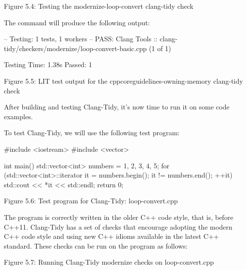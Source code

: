 \begin{center}
Figure 5.4: Testing the modernize-loop-convert clang-tidy check
\end{center}

The command will produce the following output:

\begin{shell}
-- Testing: 1 tests, 1 workers --
PASS: Clang Tools :: clang-tidy/checkers/modernize/loop-convert-basic.cpp
(1 of 1)

Testing Time: 1.38s
  Passed: 1
\end{shell}

\begin{center}
Figure 5.5: LIT test output for the cppcoreguidelines-owning-memory clang-tidy check
\end{center}

After building and testing Clang-Tidy, it's now time to run it on some code examples.



To test Clang-Tidy, we will use the following test program:

\begin{cpp}
#include <iostream>
#include <vector>

int main() {
  std::vector<int> numbers = {1, 2, 3, 4, 5};
  for (std::vector<int>::iterator it = numbers.begin(); it != numbers.end();
    ++it) {
    std::cout << *it << std::endl;
  }
  return 0;
}
\end{cpp}

\begin{center}
Figure 5.6: Test program for Clang-Tidy: loop-convert.cpp
\end{center}

The program is correctly written in the older C++ code style, that is, before C++11. Clang-Tidy has a set of checks that encourage adopting the modern C++ code style and using new C++ idioms available in the latest C++ standard. These checks can be run on the program as follows:


\begin{center}
Figure 5.7: Running Clang-Tidy modernize checks on loop-convert.cpp
\end{center}

